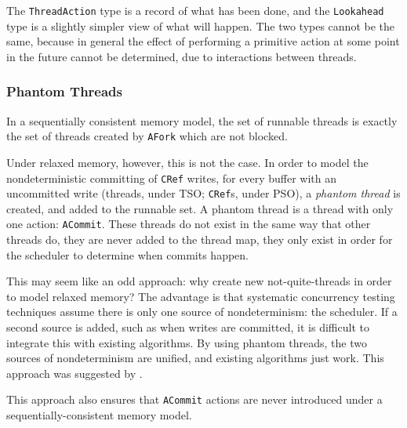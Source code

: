 The \verb|ThreadAction| type is a record of what has been done, and
the \verb|Lookahead| type is a slightly simpler view of what will
happen. The two types cannot be the same, because in general the
effect of performing a primitive action at some point in the future
cannot be determined, due to interactions between threads.

\subsubsection{Phantom Threads}
\label{sec:execution-scheduling-phantom}

In a sequentially consistent memory model, the set of runnable threads
is exactly the set of threads created by \verb|AFork| which are not
blocked.

Under relaxed memory, however, this is not the case. In order to model
the nondeterministic committing of \verb|CRef| writes, for every
buffer with an uncommitted write (threads, under TSO; \verb|CRef|s,
under PSO), a \emph{phantom thread} is created, and added to the
runnable set. A phantom thread is a thread with only one action:
\verb|ACommit|. These threads do not exist in the same way that other
threads do, they are never added to the thread map, they only exist in
order for the scheduler to determine when commits happen.

This may seem like an odd approach: why create new not-quite-threads
in order to model relaxed memory? The advantage is that systematic
concurrency testing techniques assume there is only one source of
nondeterminism: the scheduler. If a second source is added, such as
when writes are committed, it is difficult to integrate this with
existing algorithms. By using phantom threads, the two sources of
nondeterminism are unified, and existing algorithms just work. This
approach was suggested by \citep{rdpor}.

This approach also ensures that \verb|ACommit| actions are never
introduced under a sequentially-consistent memory model.
